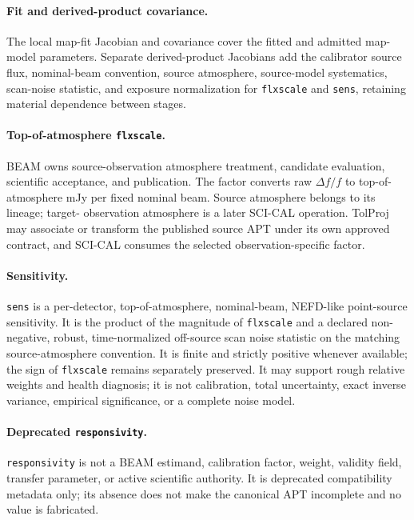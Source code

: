 \paragraph{Fit and derived-product covariance.} The local map-fit Jacobian and
covariance cover the fitted and admitted map-model parameters. Separate
derived-product Jacobians add the calibrator source flux, nominal-beam
convention, source atmosphere, source-model systematics, scan-noise statistic,
and exposure normalization for \texttt{flxscale} and \texttt{sens}, retaining
material dependence between stages.

\paragraph{Top-of-atmosphere \texttt{flxscale}.} BEAM owns source-observation
atmosphere treatment, candidate evaluation, scientific acceptance, and
publication. The factor converts raw $\Delta f/f$ to top-of-atmosphere mJy per
fixed nominal beam. Source atmosphere belongs to its lineage; target-
observation atmosphere is a later SCI-CAL operation. TolProj may associate or
transform the published source APT under its own approved contract, and
SCI-CAL consumes the selected observation-specific factor.

\paragraph{Sensitivity.} \texttt{sens} is a per-detector, top-of-atmosphere,
nominal-beam, NEFD-like point-source sensitivity. It is the product of the
magnitude of \texttt{flxscale} and a declared non-negative, robust,
time-normalized off-source scan noise statistic on the matching
source-atmosphere convention. It is finite and strictly positive whenever
available; the sign of \texttt{flxscale} remains separately preserved. It may support rough
relative weights and health diagnosis; it is not calibration, total
uncertainty, exact inverse variance, empirical significance, or a complete
noise model.

\paragraph{Deprecated \texttt{responsivity}.} \texttt{responsivity} is not a
BEAM estimand, calibration factor, weight, validity field, transfer parameter,
or active scientific authority. It is deprecated compatibility metadata only;
its absence does not make the canonical APT incomplete and no value is
fabricated.

